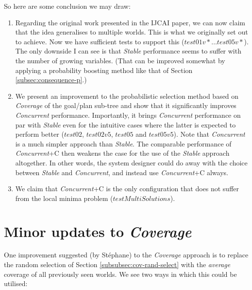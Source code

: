 \documentclass[a4paper]{article}
\newcommand{\cc}{\emph{Concurrent}\xspace}
\newcommand{\st}{\emph{Stable}\xspace}
\newcommand{\cov}{\emph{Coverage}\xspace}
\newcommand{\stephane}{{St\'ephane}\xspace}
\begin{document}
So here are some conclusion we may draw:
\begin{enumerate}
\item Regarding the original work presented in the IJCAI paper, we can now claim that the idea generalises to multiple worlds. This is what we originally set out to achieve. Now we have sufficient tests to support this ($test01v* \ldots test05v*$). The only downside I can see is that \st performance seems to suffer with the number of growing variables. (That can be improved somewhat by applying a probability boosting method like that of Section \ref{subsec:consequence-p}.)
\item We present an improvement to the probabilistic selection method based on \cov of the goal/plan sub-tree and show that it significantly improves \cc performance. Importantly, it brings \cc performance on par with \st even for the intuitive cases where the latter is expected to perform better ($test02$, $test02v5$, $test05$ and $test05v5$). Note that \cc is a much simpler approach than \st. The comparable performance of {\cc}+C then weakens the case for the use of the \st approach altogether. In other words, the system designer could do away with the choice between \st and \cc, and instead use {\cc}+C always.
\item We claim that {\cc}+C is the only configuration that does not suffer from the local minima problem ($testMultiSolutions$).
\end{enumerate}

\section{Minor updates to \cov}
\label{sec:coverage4}

One improvement suggested (by \stephane) to the \cov approach is to replace the random selection of Section \ref{subsubsec:cov-rand-select} with the \textit{average} coverage of all previously seen worlds. We see two ways in which this could be utilised:
\end{document}
